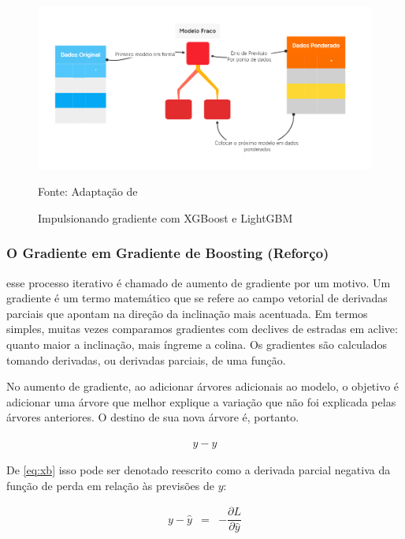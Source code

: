 \begin{figure}[H]
	\centering
	\caption{Impulsionando gradiente com XGBoost e LightGBM}
	\label{fig:xgboos}
	\includegraphics[width=1\linewidth]{Modelos/Figuras/xgboos}
	
	Fonte: Adaptação de 
\end{figure}



\subsubsection{O Gradiente em Gradiente de Boosting (Reforço)} \label{subsubsec:boosting}

 esse processo iterativo é chamado de aumento de gradiente por um motivo. Um gradiente é um termo matemático que se refere ao campo vetorial de derivadas parciais que apontam na direção da inclinação mais acentuada. Em termos simples, muitas vezes comparamos gradientes com declives de estradas em aclive: quanto maior a inclinação, mais íngreme a colina. Os gradientes são calculados tomando derivadas, ou derivadas parciais, de uma função.

No aumento de gradiente, ao adicionar árvores adicionais ao modelo, o objetivo é adicionar uma árvore que melhor explique a variação que não foi explicada pelas árvores anteriores. O destino de sua nova árvore é, portanto.

\begin{eqnarray}
	y-\hat{y}\label{eq:xb}
\end{eqnarray}

De \eqref{eq:xb} isso pode ser denotado reescrito como a derivada parcial negativa da função de perda em relação às previsões de $y$:

\begin{eqnarray}
	y-\hat{y}&=&-\dfrac{\partial L}{\partial \hat{y}}\label{eq:xb2}
\end{eqnarray}

